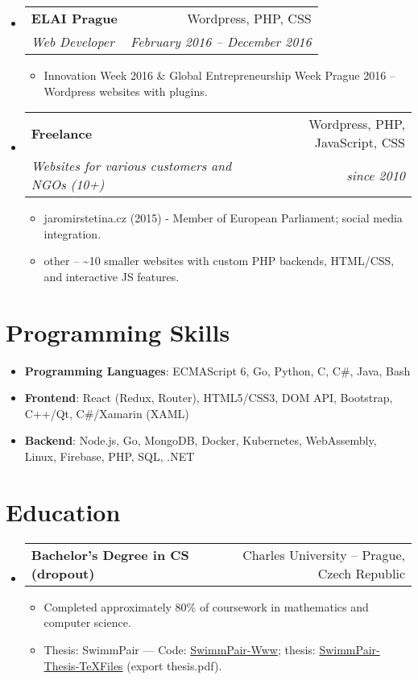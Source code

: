 \documentclass[letterpaper,11pt]{article}
\makeatletter
\newcommand{\sitem}[1]{\item #1 \vspace{-2pt}}
\newcommand{\resumeSubheading}[4]{
  \vspace{-1pt}\item
    \begin{tabular*}{0.97\textwidth}[t]{l@{\extracolsep{\fill}}r}
      \textbf{#1} & #2 \\
      \textit{\small#3} & \textit{\small #4} \\
    \end{tabular*}\vspace{-5pt}
}
\newcommand{\resumeSubheadingg}[2]{
  \vspace{-1pt}\item
    \begin{tabular*}{0.97\textwidth}[t]{l@{\extracolsep{\fill}}r}
      \textbf{#1} & #2
    \end{tabular*}\vspace{-5pt}
}
\newenvironment{subheadingListing}{\begin{itemize}[leftmargin=*]}{\end{itemize}}
\newenvironment{resumeList}{\begin{itemize}}{\end{itemize}\vspace{-5pt}}
\newcommand{\CC}{C\nolinebreak\hspace{-.05em}\raisebox{.4ex}{\tiny\bf +}\nolinebreak\hspace{-.10em}\raisebox{.4ex}{\tiny\bf +}}
\makeatother
\begin{document}
\begin{subheadingListing}
  \resumeSubheading
  {ELAI Prague}{Wordpress, PHP, CSS}
  {Web Developer}{February 2016 – December 2016}
  \begin{resumeList}
\sitem{Innovation Week 2016 \& Global Entrepreneurship Week Prague 2016 – Wordpress websites with plugins.}
 \end{resumeList}

  \resumeSubheading
  {Freelance}{Wordpress, PHP, JavaScript, CSS}
  {Websites for various customers and NGOs (10+)}{since 2010}
  \begin{resumeList}
    \sitem{jaromirstetina.cz (2015) - Member of European Parliament; social media integration.}
    \sitem{other – \textasciitilde 10 smaller websites with custom PHP backends, HTML/CSS, and interactive JS features.}

  \end{resumeList}

\end{subheadingListing}


\section{Programming Skills}
\begin{subheadingListing}
  \sitem{
    \textbf{Programming Languages}{: ECMAScript 6, Go, Python, \CC, C\#, Java, Bash}
  }
  \sitem{
    \textbf{Frontend}{: React (Redux, Router), HTML5/CSS3, DOM API, Bootstrap, C++/Qt, C\#/Xamarin (XAML)}
  }
  \sitem{
    \textbf{Backend}{: Node.js, Go, MongoDB, Docker, Kubernetes, WebAssembly, Linux, Firebase, PHP, SQL, .NET}
  }
\end{subheadingListing}


\section{Education}
\begin{subheadingListing}

  \resumeSubheadingg
  {Bachelor's Degree in CS (dropout)}{Charles University – Prague, Czech Republic}

  \begin{resumeList}
  \sitem{Completed approximately 80\% of coursework in mathematics and computer science.}
    \sitem{Thesis: SwimmPair --- Code: \href{https://github.com/KlosStepan/SwimmPair-Www}{SwimmPair-Www}; thesis: \href{https://github.com/KlosStepan/SwimmPair-Thesis-TeXFiles}{SwimmPair-Thesis-TeXFiles} (export thesis.pdf).}
  \end{resumeList}
\end{subheadingListing}
\end{document}
